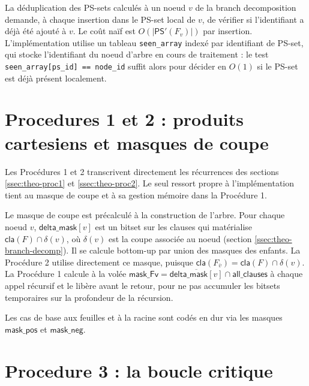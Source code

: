\documentclass[11pt,a4paper]{report}
\theoremstyle{plain}
\theoremstyle{definition}
\begin{document}
La déduplication des PS-sets calculés à un noeud $v$ de la branch
decomposition demande, à chaque insertion dans le PS-set local de $v$,
de vérifier si l'identifiant a déjà été ajouté à $v$. Le coût naïf
est $O(|\mathsf{PS}'(F_v)|)$ par insertion. L'implémentation utilise
un tableau \texttt{seen\_array} indexé par identifiant de PS-set, qui
stocke l'identifiant du noeud d'arbre en cours de traitement : le
test \texttt{seen\_array[ps\_id] == node\_id} suffit alors pour
décider en $O(1)$ si le PS-set est déjà présent localement.

\section{Procedures 1 et 2 : produits cartesiens et masques de coupe}
\label{sec:impl-proc12}

Les Procédures 1 et 2 transcrivent directement les récurrences des
sections \ref{ssec:theo-proc1} et \ref{ssec:theo-proc2}. Le seul
ressort propre à l'implémentation tient au masque de coupe et à sa
gestion mémoire dans la Procédure 1.

Le masque de coupe est précalculé à la construction de l'arbre. Pour
chaque noeud $v$, $\mathsf{delta\_mask}[v]$ est un bitset sur les
clauses qui matérialise $\mathsf{cla}(F) \cap \delta(v)$, où
$\delta(v)$ est la coupe associée au noeud
(section \ref{ssec:theo-branch-decomp}). Il se calcule bottom-up par
union des masques des enfants. La Procédure 2 utilise directement ce
masque, puisque $\mathsf{cla}(F_{\overline{v}}) = \mathsf{cla}(F) \cap
\delta(v)$. La Procédure 1 calcule à la volée
$\mathsf{mask\_Fv} = \overline{\mathsf{delta\_mask}[v]} \cap
\mathsf{all\_clauses}$ à chaque appel récursif et le libère avant le
retour, pour ne pas accumuler les bitsets temporaires sur la
profondeur de la récursion.

Les cas de base aux feuilles et à la racine sont codés en dur via les
masques $\mathsf{mask\_pos}$ et $\mathsf{mask\_neg}$.

\section{Procedure 3 : la boucle critique}
\label{sec:impl-proc3}
\end{document}
